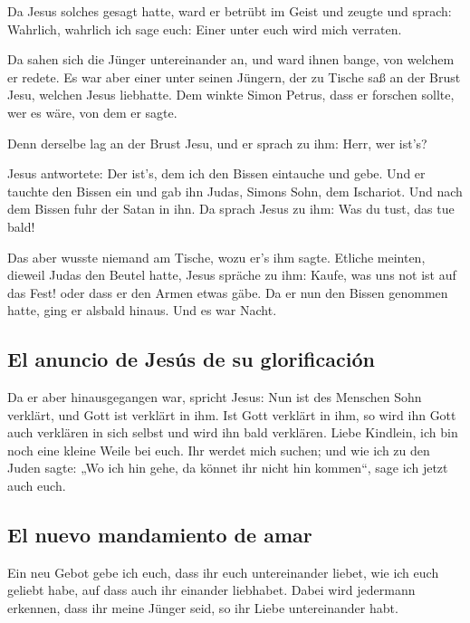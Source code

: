  Da Jesus solches gesagt hatte, ward er betrübt im Geist
und zeugte und sprach: Wahrlich, wahrlich ich sage euch: Einer unter
euch wird mich verraten.

 Da sahen sich die Jünger untereinander an, und ward
ihnen bange, von welchem er redete.  Es war aber einer
unter seinen Jüngern, der zu Tische saß an der Brust Jesu, welchen Jesus
liebhatte.  Dem winkte Simon Petrus, dass er forschen
sollte, wer es wäre, von dem er sagte.

 Denn derselbe lag an der Brust Jesu, und er sprach zu
ihm: Herr, wer ist's?

 Jesus antwortete: Der ist's, dem ich den Bissen
eintauche und gebe. Und er tauchte den Bissen ein und gab ihn Judas,
Simons Sohn, dem Ischariot.  Und nach dem Bissen fuhr der
Satan in ihn. Da sprach Jesus zu ihm: Was du tust, das tue bald!

 Das aber wusste niemand am Tische, wozu er's ihm sagte.
 Etliche meinten, dieweil Judas den Beutel hatte, Jesus
spräche zu ihm: Kaufe, was uns not ist auf das Fest! oder dass er den
Armen etwas gäbe.  Da er nun den Bissen genommen hatte,
ging er alsbald hinaus. Und es war Nacht.

\hypertarget{el-anuncio-de-jesuxfas-de-su-glorificaciuxf3n}{%
\subsection{El anuncio de Jesús de su
glorificación}\label{el-anuncio-de-jesuxfas-de-su-glorificaciuxf3n}}

 Da er aber hinausgegangen war, spricht Jesus: Nun ist
des Menschen Sohn verklärt, und Gott ist verklärt in ihm.
 Ist Gott verklärt in ihm, so wird ihn Gott auch
verklären in sich selbst und wird ihn bald verklären. 
Liebe Kindlein, ich bin noch eine kleine Weile bei euch. Ihr werdet mich
suchen; und wie ich zu den Juden sagte: „Wo ich hin gehe, da könnet ihr
nicht hin kommen``, sage ich jetzt auch euch.

\hypertarget{el-nuevo-mandamiento-de-amar}{%
\subsection{El nuevo mandamiento de
amar}\label{el-nuevo-mandamiento-de-amar}}

 Ein neu Gebot gebe ich euch, dass ihr euch untereinander
liebet, wie ich euch geliebt habe, auf dass auch ihr einander liebhabet.
 Dabei wird jedermann erkennen, dass ihr meine Jünger
seid, so ihr Liebe untereinander habt.

